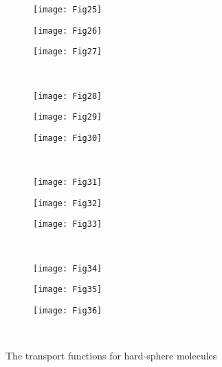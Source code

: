 \documentclass[aip,pof,preprint]{revtex4-1}
\begin{document}
\begin{figure}
    \centering
    \begin{subfigure}[b]{0.33\textwidth}
        \texttt{[image: Fig25]}
        \label{fig:B}
    \end{subfigure}%
    \begin{subfigure}[b]{0.33\textwidth}
        \texttt{[image: Fig26]}
        \label{fig:B_4}
    \end{subfigure}%
    \begin{subfigure}[b]{0.33\textwidth}
        \texttt{[image: Fig27]}
        \label{fig:T1_1}
    \end{subfigure}\\[-6pt]
    \begin{subfigure}[b]{0.33\textwidth}
        \texttt{[image: Fig28]}
        \label{fig:T1_2}
    \end{subfigure}%
    \begin{subfigure}[b]{0.33\textwidth}
        \texttt{[image: Fig29]}
        \label{fig:T2_1}
    \end{subfigure}%
    \begin{subfigure}[b]{0.33\textwidth}
        \texttt{[image: Fig30]}
        \label{fig:T2_2}
    \end{subfigure}\\[-6pt]
    \begin{subfigure}[b]{0.33\textwidth}
        \texttt{[image: Fig31]}
        \label{fig:TT12}
    \end{subfigure}%
    \begin{subfigure}[b]{0.33\textwidth}
        \texttt{[image: Fig32]}
        \label{fig:TT2}
    \end{subfigure}%
    \begin{subfigure}[b]{0.33\textwidth}
        \texttt{[image: Fig33]}
        \label{fig:Q2}
    \end{subfigure}\\[-6pt]
    \begin{subfigure}[b]{0.33\textwidth}
        \texttt{[image: Fig34]}
        \label{fig:Q3}
    \end{subfigure}%
    \begin{subfigure}[b]{0.33\textwidth}
        \texttt{[image: Fig35]}
        \label{fig:QQ22}
    \end{subfigure}%
    \begin{subfigure}[b]{0.33\textwidth}
        \texttt{[image: Fig36]}
        \label{fig:QQ3}
    \end{subfigure}\\[-6pt]
    \caption{The transport functions for hard-sphere molecules}
    \label{fig:transport_functions}
\end{figure}


\end{document}
